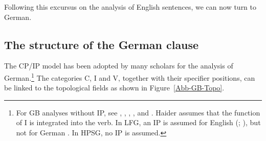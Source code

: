 %

Following this excursus on the analysis of English sentences, we can now turn to German.



\subsection{The structure of the German clause}
\label{sec-German-clause}

The CP/IP model has been adopted by many scholars for the analysis of German.\footnote{\label{fn-ip-vp}%
  For GB analyses without IP, see , ,
  , , and . Haider assumes
  that the function of I is integrated into the verb. In LFG\indexlfg, an IP is assumed for English
  (\citealp[Section~6.2]{Bresnan2001a}; \citealp[Section~3.2.1]{Dalrymple2001a-u}), but not for German \citep[Section~3.2.3.2]{Berman2003a}.
  In HPSG\indexhpsg, no IP is assumed.
} 
The categories C, I and V, together with their specifier positions, can be linked to the
topological fields as shown in Figure~\vref{Abb-GB-Topo}.

